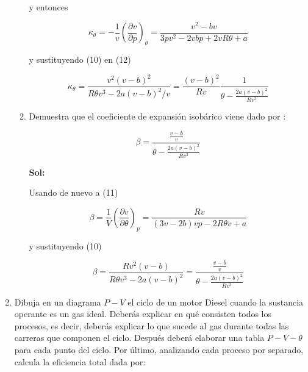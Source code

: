 \documentclass[12pt,a4paper]{article}
\begin{document}
\begin{enumerate}
\begin{enumerate}
        y entonces
        
        \begin{equation}
            \kappa_{\theta} = -\frac{1}{v} \left(\frac{\partial v}{\partial p}\right)_{\theta} = \frac{v^2 -bv}{3pv^2 - 2vbp+2vR\theta + a}
        \end{equation}
        
        y sustituyendo (10) en (12)
        
        \begin{equation}
            \kappa_{\theta} = \frac{v^2 (v-b)^2}{R\theta v^3 - 2a(v-b)^2/v} = \frac{(v-b)^2}{R v} \frac{1}{\theta - \frac{2a(v-b)^2}{Rv^3}}
        \end{equation}
        
        
        
        \item Demuestra que el coeficiente de expansión isobárico viene dado por :
        
        \begin{equation*}
            \beta =\frac{\frac{v-b}{v}}{\theta - \frac{2a(v-b)^2}{Rv^3}} 
        \end{equation*}
    
        \textbf{Sol:}
        
        Usando de nuevo a (11)
        
        \begin{equation}
            \beta = \frac{1}{V} \left(\frac{\partial v}{\partial \theta}\right)_{p} = \frac{Rv}{(3v-2b)vp-2R\theta v + a}
        \end{equation}
        
        y sustituyendo (10)
        
        \begin{equation}
            \beta = \frac{Rv^2 (v-b)}{R\theta v^3 - 2a (v-b)^2} = \frac{\frac{v-b}{v}}{\theta - \frac{2a(v-b)^2}{Rv^3}} 
        \end{equation}
        
    \end{enumerate}
    
    
    
    
    
    
    \item Dibuja en un diagrama $P- V$ el ciclo de un motor Diesel cuando la sustancia operante es un gas ideal. Deberás explicar en qué consisten todos los procesos, es decir, deberás explicar lo que sucede al gas durante todas las carreras que componen el ciclo. Después deberá elaborar una tabla $P - V - \theta$ para cada punto del ciclo. Por último, analizando cada proceso por separado, calcula la eficiencia total dada por:
    

\end{enumerate}
\end{document}
